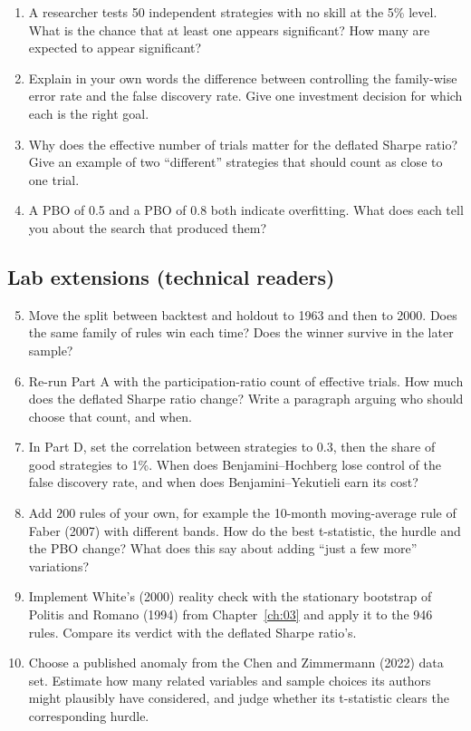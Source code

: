\begin{enumerate}
  \item A researcher tests 50 independent strategies with no skill at the 5\% level. What is the chance that at least one appears significant? How many are expected to appear significant?
  \item Explain in your own words the difference between controlling the family-wise error rate and the false discovery rate. Give one investment decision for which each is the right goal.
  \item Why does the effective number of trials matter for the deflated Sharpe ratio? Give an example of two ``different'' strategies that should count as close to one trial.
  \item A PBO of 0.5 and a PBO of 0.8 both indicate overfitting. What does each tell you about the search that produced them?
\end{enumerate}

\subsection*{Lab extensions (technical readers)}

\begin{enumerate}
  \setcounter{enumi}{4}
  \item Move the split between backtest and holdout to 1963 and then to 2000. Does the same family of rules win each time? Does the winner survive in the later sample?
  \item Re-run Part A with the participation-ratio count of effective trials. How much does the deflated Sharpe ratio change? Write a paragraph arguing who should choose that count, and when.
  \item In Part D, set the correlation between strategies to 0.3, then the share of good strategies to 1\%. When does Benjamini--Hochberg lose control of the false discovery rate, and when does Benjamini--Yekutieli earn its cost?
  \item Add 200 rules of your own, for example the 10-month moving-average rule of Faber (2007) with different bands. How do the best t-statistic, the hurdle and the PBO change? What does this say about adding ``just a few more'' variations?
  \item Implement White's (2000) reality check with the stationary bootstrap of Politis and Romano (1994) from Chapter~\ref{ch:03} and apply it to the 946 rules. Compare its verdict with the deflated Sharpe ratio's.
  \item Choose a published anomaly from the Chen and Zimmermann (2022) data set. Estimate how many related variables and sample choices its authors might plausibly have considered, and judge whether its t-statistic clears the corresponding hurdle.
\end{enumerate}

